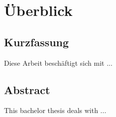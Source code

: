 \chapter*{Überblick}
\section*{Kurzfassung}
Diese Arbeit beschäftigt sich mit ...

\vfill\vfill\vfill\vfill\vfill\vfill

\section*{Abstract}
This bachelor thesis deals with ...

\vfill\vfill\vfill\vfill\vfill\vfill